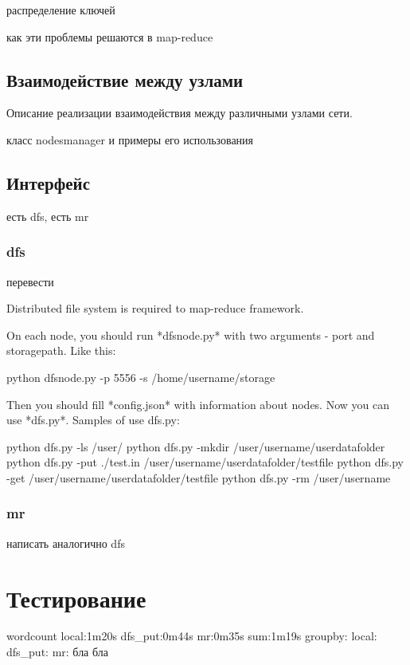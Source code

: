 \documentclass[12pt,a4paper,oneside]{extarticle}
\begin{document}
            распределение ключей

            как эти проблемы решаются в map-reduce
    \clearpage 

    \subsection{Взаимодействие между узлами}

        Описание реализации взаимодействия между различными узлами сети.

        класс nodesmanager и примеры его использования

    \clearpage

    \subsection{Интерфейс}

        есть dfs, есть mr

        \subsubsection{dfs}
            перевести

            Distributed file system is required to map-reduce framework.

            On each node, you should run *dfsnode.py* with two arguments - port and storagepath. Like this:


                python dfsnode.py -p 5556 -s /home/username/storage


            Then you should fill *config.json* with information about nodes. Now you can use *dfs.py*. Samples of use dfs.py:


                python dfs.py -ls /user/
                python dfs.py -mkdir /user/username/userdatafolder
                python dfs.py -put ./test.in /user/username/userdatafolder/testfile
                python dfs.py -get /user/username/userdatafolder/testfile
                python dfs.py -rm /user/username
        \subsubsection{mr}
            написать аналогично dfs
    \clearpage  


\clearpage

\section{Тестирование}
\label{sec:tests}
    wordcount
        local:1m20s
        dfs_put:0m44s
        mr:0m35s
        sum:1m19s
    groupby:
        local:
        dfs_put:
        mr:
    бла бла
        
\end{document}
